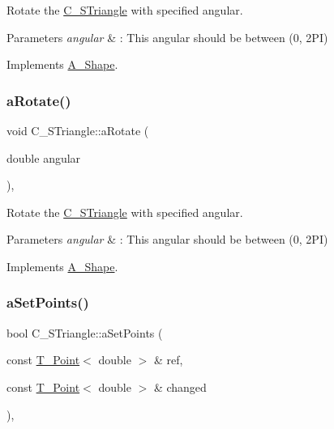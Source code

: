 Rotate the \hyperlink{classC__STriangle}{C\+\_\+\+S\+Triangle} with specified angular. 


\begin{DoxyParams}{Parameters}
{\em angular} & \+: This angular should be between (0, 2\+PI) \\
\hline
\end{DoxyParams}


Implements \hyperlink{classA__Shape_a25b4e0c34cdb46da5382fe9c7467efaf}{A\+\_\+\+Shape}.

\mbox{\label{classC__STriangle_a52612242aba17043862355c030637a18}} 
\subsubsection{\texorpdfstring{a\+Rotate()}{aRotate()}\hspace{0.1cm}{\footnotesize\ttfamily [2/2]}}
{\footnotesize\ttfamily void C\+\_\+\+S\+Triangle\+::a\+Rotate (\begin{DoxyParamCaption}\item[{double}]{angular }\end{DoxyParamCaption})\hspace{0.3cm}{\ttfamily [override]}, {\ttfamily [virtual]}}



Rotate the \hyperlink{classC__STriangle}{C\+\_\+\+S\+Triangle} with specified angular. 


\begin{DoxyParams}{Parameters}
{\em angular} & \+: This angular should be between (0, 2\+PI) \\
\hline
\end{DoxyParams}


Implements \hyperlink{classA__Shape_a25b4e0c34cdb46da5382fe9c7467efaf}{A\+\_\+\+Shape}.

\mbox{\label{classC__STriangle_a431802d5e10b69f535e7929a23963b5e}} 
\subsubsection{\texorpdfstring{a\+Set\+Points()}{aSetPoints()}\hspace{0.1cm}{\footnotesize\ttfamily [1/2]}}
{\footnotesize\ttfamily bool C\+\_\+\+S\+Triangle\+::a\+Set\+Points (\begin{DoxyParamCaption}\item[{const \hyperlink{classT__Point}{T\+\_\+\+Point}$<$ double $>$ \&}]{ref,  }\item[{const \hyperlink{classT__Point}{T\+\_\+\+Point}$<$ double $>$ \&}]{changed }\end{DoxyParamCaption})\hspace{0.3cm}{\ttfamily [override]}, {\ttfamily [virtual]}}



